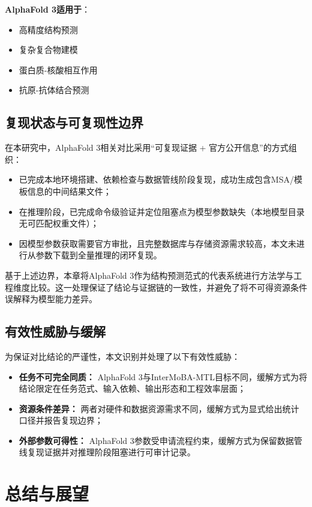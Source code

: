 \textbf{AlphaFold 3适用于}：
\begin{itemize}
    \item 高精度结构预测
    \item 复杂复合物建模
    \item 蛋白质-核酸相互作用
    \item 抗原-抗体结合预测
\end{itemize}

\subsection{复现状态与可复现性边界}

在本研究中，AlphaFold 3相关对比采用``可复现证据 + 官方公开信息''的方式组织：
\begin{itemize}
  \item 已完成本地环境搭建、依赖检查与数据管线阶段复现，成功生成包含MSA/模板信息的中间结果文件；
  \item 在推理阶段，已完成命令级验证并定位阻塞点为模型参数缺失（本地模型目录无可匹配权重文件）；
  \item 因模型参数获取需要官方审批，且完整数据库与存储资源需求较高，本文未进行从参数下载到全量推理的闭环复现。
\end{itemize}

基于上述边界，本章将AlphaFold 3作为结构预测范式的代表系统进行方法学与工程维度比较。这一处理保证了结论与证据链的一致性，并避免了将不可得资源条件误解释为模型能力差异。

\subsection{有效性威胁与缓解}

为保证对比结论的严谨性，本文识别并处理了以下有效性威胁：
\begin{itemize}
  \item \textbf{任务不可完全同质：} AlphaFold 3与InterMoBA-MTL目标不同，缓解方式为将结论限定在任务范式、输入依赖、输出形态和工程效率层面；
  \item \textbf{资源条件差异：} 两者对硬件和数据资源需求不同，缓解方式为显式给出统计口径并报告复现边界；
  \item \textbf{外部参数可得性：} AlphaFold 3参数受申请流程约束，缓解方式为保留数据管线复现证据并对推理阶段阻塞进行可审计记录。
\end{itemize}

\newpage

\section{总结与展望}
